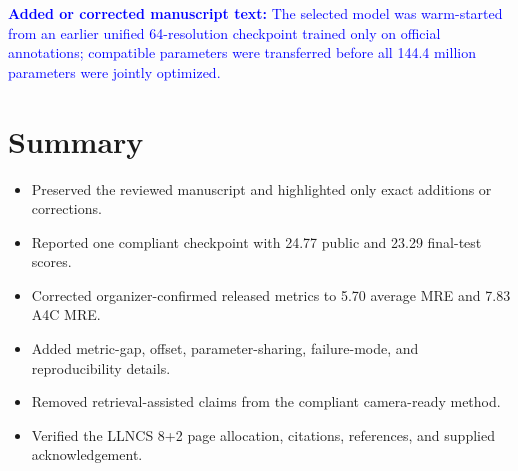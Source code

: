 \documentclass[11pt]{article}
\newcommand{\manuscriptchange}[1]{\par\smallskip\noindent\textcolor{blue}{\textbf{Added or corrected manuscript text:} #1}\par\smallskip}
\begin{document}
\manuscriptchange{The selected model was warm-started from an earlier unified 64-resolution checkpoint trained only on official annotations; compatible parameters were transferred before all 144.4 million parameters were jointly optimized.}

\section*{Summary}

\begin{itemize}
  \item Preserved the reviewed manuscript and highlighted only exact additions or corrections.
  \item Reported one compliant checkpoint with 24.77 public and 23.29 final-test scores.
  \item Corrected organizer-confirmed released metrics to 5.70 average MRE and 7.83 A4C MRE.
  \item Added metric-gap, offset, parameter-sharing, failure-mode, and reproducibility details.
  \item Removed retrieval-assisted claims from the compliant camera-ready method.
  \item Verified the LLNCS 8+2 page allocation, citations, references, and supplied acknowledgement.
\end{itemize}
\end{document}
